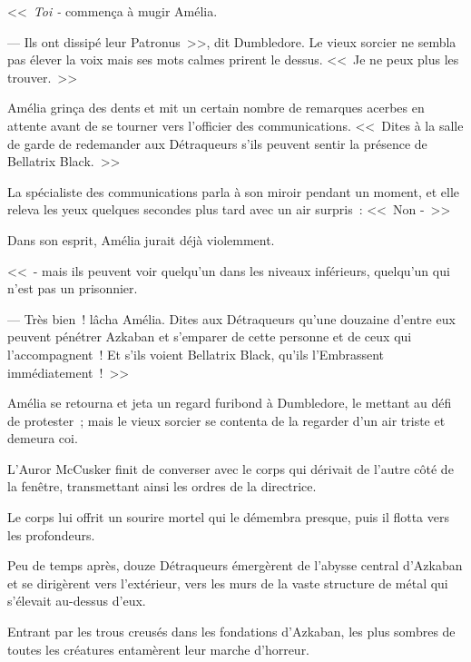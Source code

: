 <<~\emph{Toi -} commença à mugir Amélia.

--- Ils ont dissipé leur Patronus~>>, dit Dumbledore. Le vieux sorcier ne sembla pas élever la voix mais ses mots calmes prirent le dessus. <<~Je ne peux plus les trouver.~>>

Amélia grinça des dents et mit un certain nombre de remarques acerbes en attente avant de se tourner vers l'officier des communications. <<~Dites à la salle de garde de redemander aux Détraqueurs s'ils peuvent sentir la présence de Bellatrix Black.~>>

La spécialiste des communications parla à son miroir pendant un moment, et elle releva les yeux quelques secondes plus tard avec un air surpris~: <<~Non -~>>

Dans son esprit, Amélia jurait déjà violemment.

<<~- mais ils peuvent voir quelqu'un dans les niveaux inférieurs, quelqu'un qui n'est pas un prisonnier.

--- Très bien~! lâcha Amélia. Dites aux Détraqueurs qu'une douzaine d'entre eux peuvent pénétrer Azkaban et s'emparer de cette personne et de ceux qui l'accompagnent~! Et s'ils voient Bellatrix Black, qu'ils l'Embrassent immédiatement~!~>>

Amélia se retourna et jeta un regard furibond à Dumbledore, le mettant au défi de protester~; mais le vieux sorcier se contenta de la regarder d'un air triste et demeura coi.

\later

L'Auror McCusker finit de converser avec le corps qui dérivait de l'autre côté de la fenêtre, transmettant ainsi les ordres de la directrice.

Le corps lui offrit un sourire mortel qui le démembra presque, puis il flotta vers les profondeurs.

Peu de temps après, douze Détraqueurs émergèrent de l'abysse central d'Azkaban et se dirigèrent vers l'extérieur, vers les murs de la vaste structure de métal qui s'élevait au-dessus d'eux.

Entrant par les trous creusés dans les fondations d'Azkaban, les plus sombres de toutes les créatures entamèrent leur marche d'horreur.

